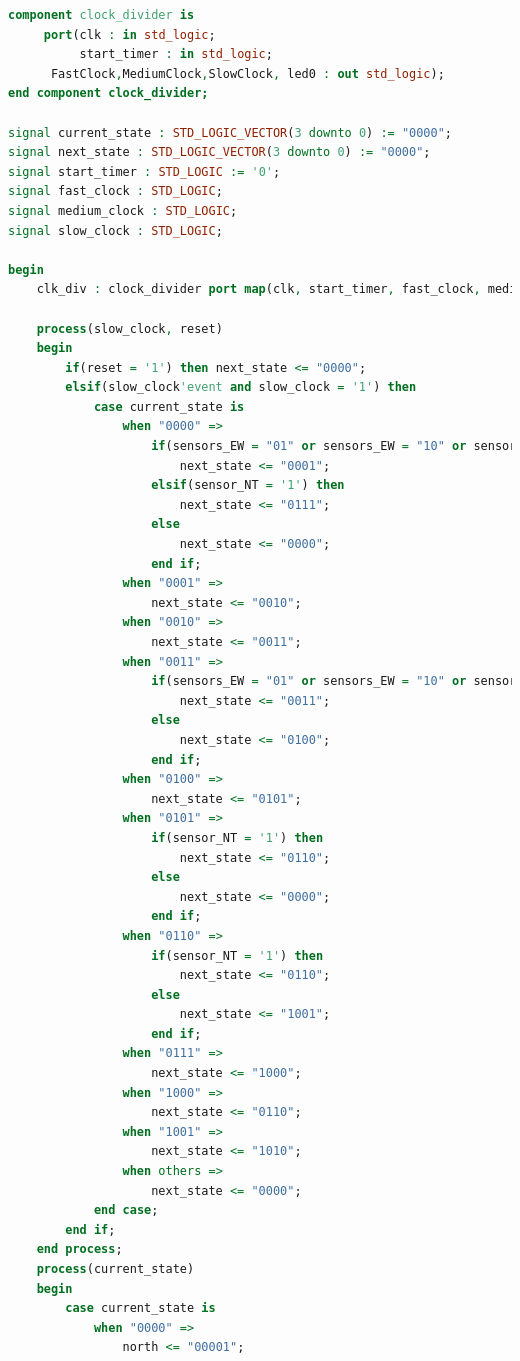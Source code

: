 \documentclass[11pt]{article}
\begin{document}
\begin{appendices}
\begin{lstlisting}[language=VHDL]
component clock_divider is
     port(clk : in std_logic;
          start_timer : in std_logic;
	  FastClock,MediumClock,SlowClock, led0 : out std_logic);
end component clock_divider;

signal current_state : STD_LOGIC_VECTOR(3 downto 0) := "0000";
signal next_state : STD_LOGIC_VECTOR(3 downto 0) := "0000";
signal start_timer : STD_LOGIC := '0';
signal fast_clock : STD_LOGIC;
signal medium_clock : STD_LOGIC;
signal slow_clock : STD_LOGIC;

begin
    clk_div : clock_divider port map(clk, start_timer, fast_clock, medium_clock, slow_clock, clock_led);
    
    process(slow_clock, reset)
    begin
        if(reset = '1') then next_state <= "0000";
        elsif(slow_clock'event and slow_clock = '1') then
            case current_state is
                when "0000" =>
                    if(sensors_EW = "01" or sensors_EW = "10" or sensors_EW = "11") then
                        next_state <= "0001";
                    elsif(sensor_NT = '1') then 
                        next_state <= "0111";
                    else
                        next_state <= "0000";
                    end if;
                when "0001" =>
                    next_state <= "0010";
                when "0010" =>
                    next_state <= "0011";
                when "0011" =>
                    if(sensors_EW = "01" or sensors_EW = "10" or sensors_EW = "11") then
                        next_state <= "0011";
                    else
                        next_state <= "0100";
                    end if;
                when "0100" =>
                    next_state <= "0101";
                when "0101" =>
                    if(sensor_NT = '1') then
                        next_state <= "0110";
                    else
                        next_state <= "0000";
                    end if;
                when "0110" =>
                    if(sensor_NT = '1') then
                        next_state <= "0110";
                    else
                        next_state <= "1001";
                    end if;
                when "0111" =>
                    next_state <= "1000";
                when "1000" =>
                    next_state <= "0110";
                when "1001" =>
                    next_state <= "1010";
                when others =>
                    next_state <= "0000";
            end case;
        end if;
    end process;
    process(current_state)
    begin
        case current_state is
            when "0000" =>
                north <= "00001";

\end{lstlisting}
\end{appendices}
\end{document}
